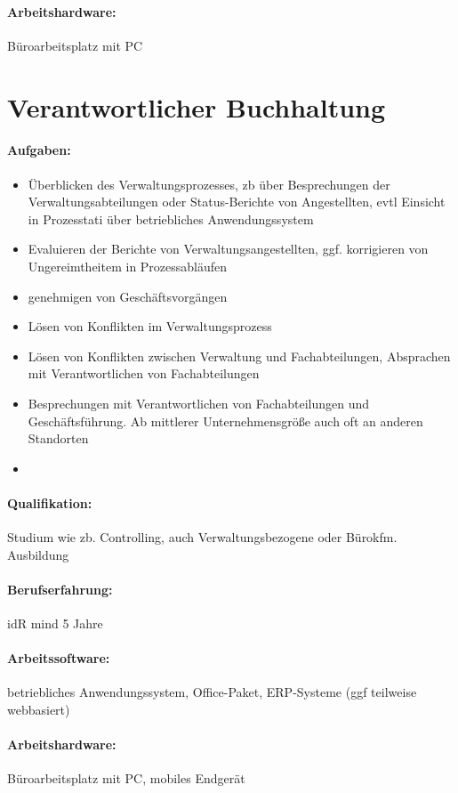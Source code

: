 \documentclass[11pt,oneside,a4paper,notitlepage]{article}
\begin{document}
\paragraph*{Arbeitshardware: } Büroarbeitsplatz mit PC



%
%
\section{Verantwortlicher Buchhaltung}

\paragraph*{Aufgaben: }
\begin{itemize}
\item Überblicken des Verwaltungsprozesses, zb über Besprechungen der Verwaltungsabteilungen oder Status-Berichte von Angestellten, evtl Einsicht in Prozesstati über betriebliches Anwendungssystem
\item Evaluieren der Berichte von Verwaltungsangestellten, ggf. korrigieren von Ungereimtheitem in Prozessabläufen
\item genehmigen von Geschäftsvorgängen
\item Lösen von Konflikten im Verwaltungsprozess
\item Lösen von Konflikten zwischen Verwaltung und Fachabteilungen, Absprachen mit Verantwortlichen von Fachabteilungen
\item Besprechungen mit Verantwortlichen von Fachabteilungen und Geschäftsführung. Ab mittlerer Unternehmensgröße auch oft an anderen Standorten
\item 
\end{itemize}
\noindent
%
\paragraph*{Qualifikation: } Studium wie zb. Controlling, auch Verwaltungsbezogene oder Bürokfm. Ausbildung
%
\paragraph*{Berufserfahrung: } idR mind 5 Jahre
%
\paragraph*{Arbeitssoftware: } betriebliches Anwendungssystem, Office-Paket, ERP-Systeme (ggf teilweise webbasiert)
%
\paragraph*{Arbeitshardware: } Büroarbeitsplatz mit PC, mobiles Endgerät
\end{document}
